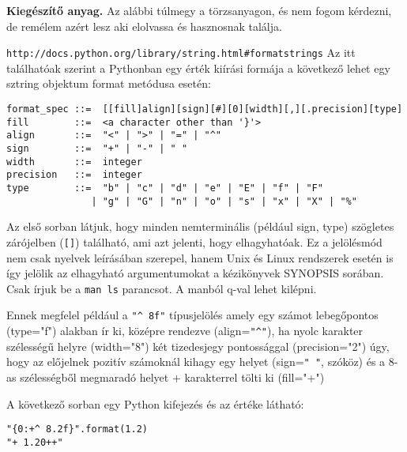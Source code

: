 \documentclass[a4paper]{article}
\begin{document}
\begin{leftbar}
\small
\textbf{Kiegészítő anyag.}
Az alábbi túlmegy a törzsanyagon, és nem fogom kérdezni, de remélem azért lesz
aki elolvassa és hasznosnak találja.

\verb+http://docs.python.org/library/string.html#formatstrings+ Az itt
találhatóak szerint a Pythonban egy érték kiírási formája a következő lehet egy
sztring objektum format metódusa esetén:

\begin{verbatim}
format_spec ::=  [[fill]align][sign][#][0][width][,][.precision][type]
fill        ::=  <a character other than '}'>
align       ::=  "<" | ">" | "=" | "^"
sign        ::=  "+" | "-" | " "
width       ::=  integer
precision   ::=  integer
type        ::=  "b" | "c" | "d" | "e" | "E" | "f" | "F"
               | "g" | "G" | "n" | "o" | "s" | "x" | "X" | "%"
\end{verbatim}

Az első sorban látjuk, hogy minden nemterminális (például sign, type) szögletes
zárójelben (\verb+[]+) található, ami azt jelenti, hogy elhagyhatóak.
{\footnotesize Ez a jelölésmód nem csak nyelvek leírásában szerepel, hanem Unix
és Linux rendszerek esetén is így jelölik az elhagyható argumentumokat a
kézikönyvek SYNOPSIS sorában. Csak írjuk be a \texttt{man ls} parancsot.
\scriptsize A manból q-val lehet kilépni.}

Ennek megfelel például a \verb+"^ 8f"+ típusjelölés amely egy számot lebegőpontos
(type="f") alakban ír ki, középre rendezve (align=\verb+"^"+), ha nyolc
karakter szélességű helyre (width="8") két tizedesjegy pontossággal
(precision="2") úgy, hogy az előjelnek pozitív számoknál kihagy egy helyet
(sign=\verb'" "', szóköz) és a 8-as szélességből megmaradó helyet + karakterrel
tölti ki (fill="+")

A következő sorban egy Python kifejezés és az értéke látható:
\begin{verbatim}
"{0:+^ 8.2f}".format(1.2)
"+ 1.20++"
\end{verbatim}
\end{leftbar}
\end{document}
